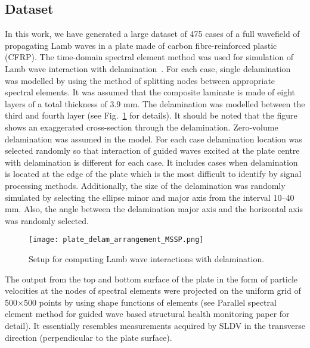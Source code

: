 \subsection{Dataset}
	In this work, we have generated a large dataset of 475 cases of a full wavefield of propagating Lamb waves in a plate made of carbon fibre-reinforced plastic (CFRP).
	The time-domain spectral element method was used for simulation of Lamb wave interaction with delamination~\cite{Kudela2020}.
	For each case, single delamination was modelled by using the method of splitting nodes between appropriate spectral elements. 
	It was assumed that the composite laminate is made of eight layers of a total thickness of 3.9 mm.
	The delamination was modelled between the third and fourth layer (see Fig.~\ref{fig:plate_setup} for details).
	It should be noted that the figure shows an exaggerated cross-section through the delamination. 
	Zero-volume delamination was assumed in the model. 
	For each case delamination location was selected randomly so that interaction of guided waves excited at the plate centre with delamination is different for each case.
	It includes cases when delamination is located at the edge of the plate which is the most difficult to identify by signal processing methods.
	Additionally, the size of the delamination was randomly simulated by selecting the ellipse minor and major axis from the interval 10--40 mm.
	Also, the angle between the delamination major axis and the horizontal axis was randomly selected.
	\begin{figure}
		\centering
		\texttt{[image: plate\_delam\_arrangement\_MSSP.png]}
		\caption{Setup for computing Lamb wave interactions with delamination.}
		\label{fig:plate_setup}
	\end{figure}

	The output from the top and bottom surface of the plate in the form of particle velocities at the nodes of spectral elements were projected on the uniform grid of 500\(\times\)500 points by using shape functions of elements (see Parallel spectral element method for guided wave based structural health monitoring paper for detail).
	It essentially resembles measurements acquired by SLDV in the transverse direction (perpendicular to the plate surface).
